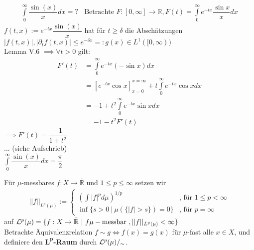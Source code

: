   \begin{example}
    \begin{align*}
      \int\limits_0^{\infty} \dfrac{\sin(x)}{x} dx = ? \ \ \ \ \text{Betrachte $F: [0, \infty] \to \mathbb{R}, F(t) = \int\limits_0^{\infty} e^{-tx} \dfrac{\sin{x}}{x} dx$}
    \end{align*}
    $f(t,x) := e^{-tx} \dfrac{\sin(x)}{x}$ hat für $t \geq \delta$ die Abschätzungen\\
    $|f(t,x)|, |\partial_t f(t,x)| \leq e^{-\delta x} =: g(x) \in L^1([0, \infty))$\\
    Lemma V.6 $\implies \forall t > 0$ gilt: 
    \begin{align*}
      F'(t) &= \int\limits_0^{\infty} e^{-tx} (-\sin{x}) dx\\
            &= [e^{-tx} \cos{x}]_{x=0}^{x=\infty} + t \int\limits_0^{\infty} e^{-tx} \cos{x} dx\\
            &= -1 + t^2 \int\limits_0^{\infty} e^{-tx} \sin{x} dx\\
            &= -1 - t^2 F'(t)
    \end{align*}
    $\implies F'(t) = \dfrac{-1}{1+t^2}$\\
    \newline
    ... (siehe Aufschrieb)\\
    \newline
    $\int\limits_0^{\infty} \dfrac{\sin(x)}{x} dx = \dfrac{\pi}{2}$
  \end{example}

  \newpage
  \begin{definition}[$L^p$-Norm]
    Für $\mu$-messbares $f: X \to \bar{\mathbb{R}}$ und $1 \leq p \leq \infty$ setzen wir
    \begin{align*}
      ||f||_{L^p(\mu)} := \begin{cases}
        (\int |f|^p d\mu)^{1/p} & \text{, für } 1\leq p < \infty\\
        \inf\{s>0 \ | \ \mu(\{|f| > s\})=0\} & \text{, für } p = \infty
      \end{cases}
    \end{align*}
    auf $\mathcal{L}^p(\mu) = \{f:X \to \bar{\mathbb{R}} \ | \ f \mu-\text{messbar }, ||f||_{L^p(\mu)} < \infty\}$\\
    Betrachte Äquivalenzrelation $f\sim g \Leftrightarrow f(x) = g(x)$ für $\mu$-fast alle $x \in X$, und definiere den $\bm{L^p}$\textbf{-Raum} durch $\mathcal{L}^p(\mu)/_{\sim}$.
  \end{definition}

